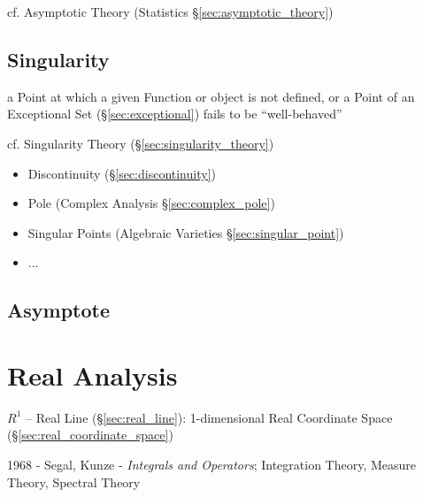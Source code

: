 \fist cf. Asymptotic Theory (Statistics \S\ref{sec:asymptotic_theory})



\subsection{Singularity}\label{sec:singularity}


a Point at which a given Function or object is not defined, or a Point of an
Exceptional Set (\S\ref{sec:exceptional}) fails to be ``well-behaved''

\fist cf. Singularity Theory (\S\ref{sec:singularity_theory})

\begin{itemize}
  \item Discontinuity (\S\ref{sec:discontinuity})
  \item Pole (Complex Analysis \S\ref{sec:complex_pole})
  \item Singular Points (Algebraic Varieties \S\ref{sec:singular_point})
  \item ...
\end{itemize}



\subsection{Asymptote}\label{sec:asymptote}



\section{Real Analysis}\label{sec:real_analysis}

$R^1$ -- Real Line (\S\ref{sec:real_line}): 1-dimensional Real
Coordinate Space (\S\ref{sec:real_coordinate_space})

1968 - Segal, Kunze - \emph{Integrals and Operators}; Integration Theory,
Measure Theory, Spectral Theory



